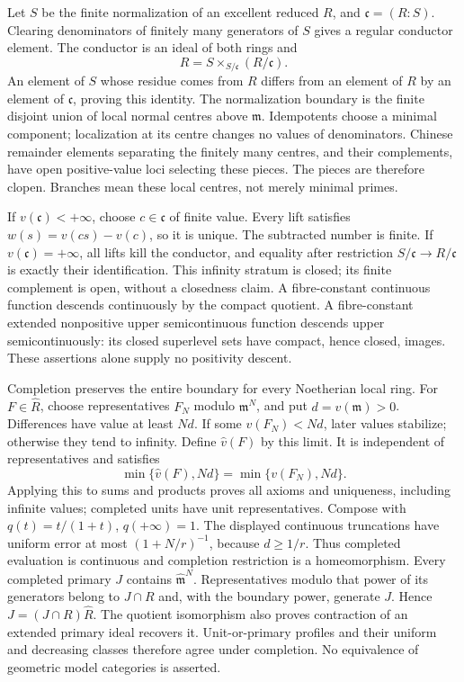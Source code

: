 \documentclass[11pt]{article}
\begin{document}
Let \(S\) be the finite normalization of an excellent reduced \(R\), and \(\mathfrak c=(R:S)\). Clearing denominators of finitely many generators of \(S\) gives a regular conductor element. The conductor is an ideal of both rings and
\[
R=S\times_{S/\mathfrak c}(R/\mathfrak c).
\]
An element of \(S\) whose residue comes from \(R\) differs from an element of \(R\) by an element of \(\mathfrak c\), proving this identity. The normalization boundary is the finite disjoint union of local normal centres above \(\mathfrak m\). Idempotents choose a minimal component; localization at its centre changes no values of denominators. Chinese remainder elements separating the finitely many centres, and their complements, have open positive-value loci selecting these pieces. The pieces are therefore clopen. Branches mean these local centres, not merely minimal primes.

If \(v(\mathfrak c)<+\infty\), choose \(c\in\mathfrak c\) of finite value. Every lift satisfies \(w(s)=v(cs)-v(c)\), so it is unique. The subtracted number is finite. If \(v(\mathfrak c)=+\infty\), all lifts kill the conductor, and equality after restriction \(S/\mathfrak c\to R/\mathfrak c\) is exactly their identification. This infinity stratum is closed; its finite complement is open, without a closedness claim. A fibre-constant continuous function descends continuously by the compact quotient. A fibre-constant extended nonpositive upper semicontinuous function descends upper semicontinuously: its closed superlevel sets have compact, hence closed, images. These assertions alone supply no positivity descent.

Completion preserves the entire boundary for every Noetherian local ring. For \(F\in\widehat R\), choose representatives \(F_N\) modulo \(\mathfrak m^N\), and put \(d=v(\mathfrak m)>0\). Differences have value at least \(Nd\). If some \(v(F_N)<Nd\), later values stabilize; otherwise they tend to infinity. Define \(\widehat v(F)\) by this limit. It is independent of representatives and satisfies
\[
\min\{\widehat v(F),Nd\}=\min\{v(F_N),Nd\}.
\]
Applying this to sums and products proves all axioms and uniqueness, including infinite values; completed units have unit representatives. Compose with \(q(t)=t/(1+t)\), \(q(+\infty)=1\). The displayed continuous truncations have uniform error at most \((1+N/r)^{-1}\), because \(d\ge1/r\). Thus completed evaluation is continuous and completion restriction is a homeomorphism. Every completed primary \(J\) contains \(\widehat{\mathfrak m}^N\). Representatives modulo that power of its generators belong to \(J\cap R\) and, with the boundary power, generate \(J\). Hence \(J=(J\cap R)\widehat R\). The quotient isomorphism also proves contraction of an extended primary ideal recovers it. Unit-or-primary profiles and their uniform and decreasing classes therefore agree under completion. No equivalence of geometric model categories is asserted.
\end{document}
